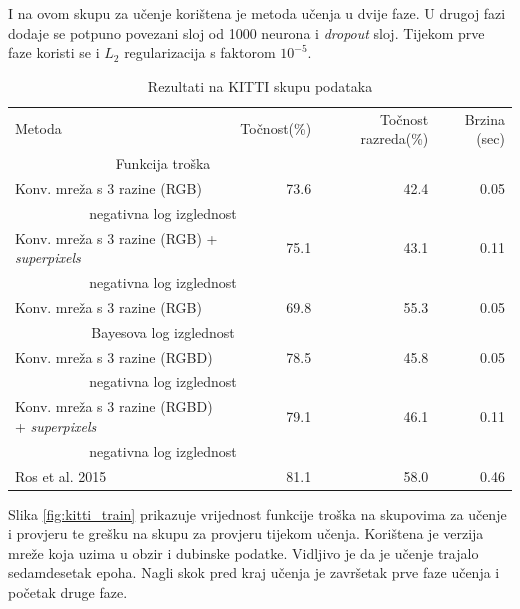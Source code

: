 \documentclass[times, utf8, diplomski, numeric]{fer}
\begin{document}
I na ovom skupu za učenje korištena je metoda učenja u dvije faze. U drugoj fazi dodaje se potpuno povezani sloj od 1000 neurona i \textit{dropout} sloj. Tijekom prve faze koristi se i $L_2$ regularizacija s faktorom $10^{-5}$.

\begin{table}
\centering

\begin{adjustbox}{center}
\begin{tabular}{l r r r}
  Metoda & Točnost(\%) & Točnost razreda(\%) & Brzina (sec) \\
    \multicolumn{2}{c}{Funkcija troška} & & \\[0.6em] \hline

  Konv. mreža s 3 razine (RGB) & 73.6 & 42.4 & 0.05 \\
    \multicolumn{2}{c}{negativna log izglednost} & & \\ \hline
  Konv. mreža s 3 razine (RGB) + \textit{superpixels} & 75.1 & 43.1 & 0.11 \\
    \multicolumn{2}{c}{negativna log izglednost} & & \\ \hline
  Konv. mreža s 3 razine (RGB) & 69.8 & 55.3 & 0.05 \\
    \multicolumn{2}{c}{Bayesova log izglednost} & & \\ \hline
  Konv. mreža s 3 razine (RGBD) & 78.5 & 45.8 & 0.05 \\
    \multicolumn{2}{c}{negativna log izglednost} & & \\ \hline
  Konv. mreža s 3 razine (RGBD) + \textit{superpixels} & 79.1 & 46.1 & 0.11 \\
    \multicolumn{2}{c}{negativna log izglednost} & & \\ \hline \hline
    
  Ros et al.\cite{ros:2015} 2015 & 81.1 & 58.0 & 0.46
\end{tabular}
\end{adjustbox}

\caption{Rezultati na KITTI skupu podataka}
\end{table}

Slika \ref{fig:kitti_train} prikazuje vrijednost funkcije troška na skupovima za učenje i provjeru te grešku na skupu za provjeru tijekom učenja. Korištena je verzija mreže koja uzima u obzir i dubinske podatke. Vidljivo je da je učenje trajalo sedamdesetak epoha. Nagli skok pred kraj učenja je završetak prve faze učenja i početak druge faze.
\end{document}

